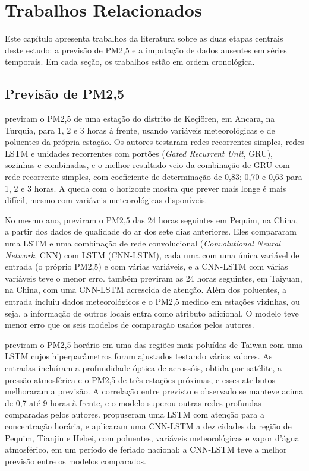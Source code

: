 \chapter{Trabalhos Relacionados}
\label{chap:trabalhos_relacionados}

Este capítulo apresenta trabalhos da literatura sobre as duas etapas centrais deste estudo: a previsão de PM2,5 e a imputação de dados ausentes em séries temporais. Em cada seção, os trabalhos estão em ordem cronológica.

\section{Previsão de PM2,5}
\label{sec:relacionados_previsao}

 previram o PM2,5 de uma estação do distrito de Keçiören, em Ancara, na Turquia, para 1, 2 e 3 horas à frente, usando variáveis meteorológicas e de poluentes da própria estação. Os autores testaram redes recorrentes simples, redes LSTM e unidades recorrentes com portões (\textit{Gated Recurrent Unit}, GRU), sozinhas e combinadas, e o melhor resultado veio da combinação de GRU com rede recorrente simples, com coeficiente de determinação de 0,83; 0,70 e 0,63 para 1, 2 e 3 horas. A queda com o horizonte mostra que prever mais longe é mais difícil, mesmo com variáveis meteorológicas disponíveis.

No mesmo ano,  previram o PM2,5 das 24 horas seguintes em Pequim, na China, a partir dos dados de qualidade do ar dos sete dias anteriores. Eles compararam uma LSTM e uma combinação de rede convolucional (\textit{Convolutional Neural Network}, CNN) com LSTM (CNN-LSTM), cada uma com uma única variável de entrada (o próprio PM2,5) e com várias variáveis, e a CNN-LSTM com várias variáveis teve o menor erro.  também previram as 24 horas seguintes, em Taiyuan, na China, com uma CNN-LSTM acrescida de atenção. Além dos poluentes, a entrada incluiu dados meteorológicos e o PM2,5 medido em estações vizinhas, ou seja, a informação de outros locais entra como atributo adicional. O modelo teve menor erro que os seis modelos de comparação usados pelos autores.

 previram o PM2,5 horário em uma das regiões mais poluídas de Taiwan com uma LSTM cujos hiperparâmetros foram ajustados testando vários valores. As entradas incluíram a profundidade óptica de aerossóis, obtida por satélite, a pressão atmosférica e o PM2,5 de três estações próximas, e esses atributos melhoraram a previsão. A correlação entre previsto e observado se manteve acima de 0,7 até 9 horas à frente, e o modelo superou outras redes profundas comparadas pelos autores.  propuseram uma LSTM com atenção para a concentração horária, e  aplicaram uma CNN-LSTM a dez cidades da região de Pequim, Tianjin e Hebei, com poluentes, variáveis meteorológicas e vapor d'água atmosférico, em um período de feriado nacional; a CNN-LSTM teve a melhor previsão entre os modelos comparados.

